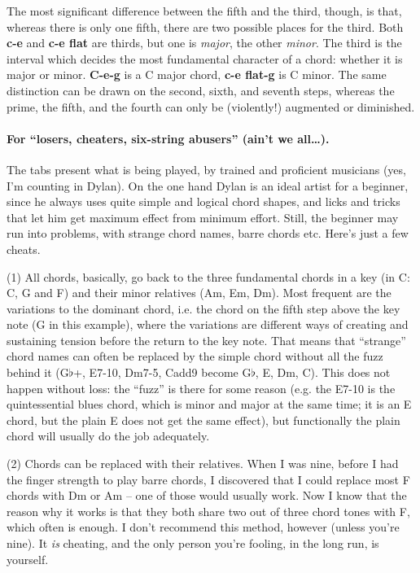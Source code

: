 \begin{articlelayout}
The most significant difference between the fifth and the third,
though, is that, whereas there is only one fifth, there are two
possible places for the third. Both \textbf{c-e} and \textbf{c-e flat}
are thirds, but one is \emph{major}, the other \emph{minor}. The third
is the interval which decides the most fundamental character of a
chord: whether it is major or minor. \textbf{C-e-g} is a C major
chord, \textbf{c-e flat-g}  is C minor. The same distinction can be
drawn on the second, sixth, and seventh steps, whereas the prime, the
fifth, and the fourth can only be (violently!) augmented or
diminished.

\paragraph{For ``losers, cheaters, six-string abusers'' (ain't we
all\ldots).}  The tabs present what is being played, by trained and
proficient musicians (yes, I'm counting in Dylan). On the one hand
Dylan is an ideal artist for a beginner, since he always uses quite
simple and logical chord shapes, and licks and tricks that let him get
maximum effect from minimum effort. Still, the beginner may run into
problems, with strange chord names, barre chords etc. Here's just a
few cheats.

(1) All chords, basically, go back to the three fundamental chords in
a key (in C: C, G and F) and their minor relatives (Am, Em, Dm). Most
frequent are the variations to the dominant chord, i.e. the chord on
the fifth step above the key note (G in this example), where the
variations are different ways of creating and sustaining tension
before the return to the key note. That means that ``{}strange''{}
chord names can often be replaced by the simple chord without all the
fuzz behind it (G$\flat$+, E7-10, Dm7-5, Cadd9 become G$\flat$, E, Dm,
C). This does not happen without loss: the ``{}fuzz''{} is there for
some reason (e.g. the E7-10 is the quintessential blues chord, which
is minor and major at the same time; it is an E chord, but the plain E
does not get the same effect), but functionally the plain chord will
usually do the job adequately.

(2) Chords can be replaced with their relatives. When I was nine,
before I had the finger strength to play barre chords, I discovered
that I could replace most F chords with Dm or Am -- one of those would
usually work. Now I know that the reason why it works is that they
both share two out of three chord tones with F, which often is
enough. I don't recommend this method, however (unless you're
nine). It \emph{is} cheating, and the only person you're fooling, in
the long run, is yourself.


\end{articlelayout}
